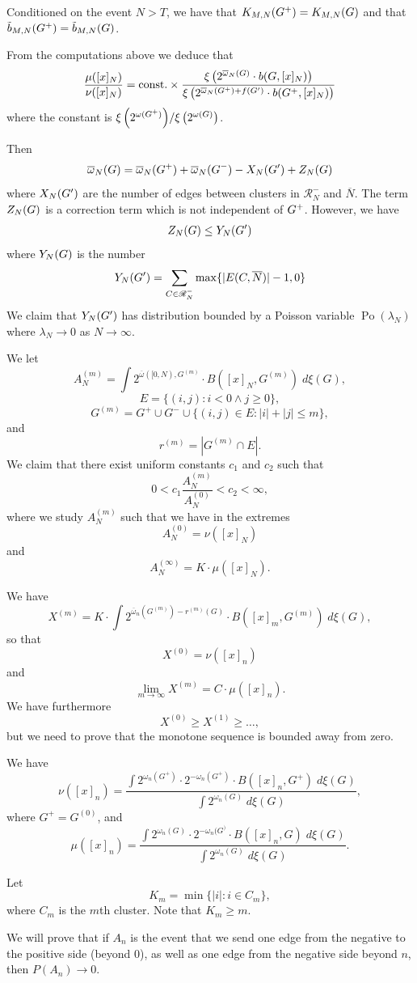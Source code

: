 \documentclass[11pt, a4paper, oneside]{scrartcl}
\theoremstyle{definition}
\theoremstyle{remark}
\providecommand{\mscr}{\mathscr}
\providecommand{\opn}{\operatorname}
\providecommand{\ol}{\overline}
\begin{document}
Conditioned on the event $N>T$, we have that $K_{M,N}(G^+)=K_{M,N}(G)$ and that $\tilde b_{M,N}(G^+)=\tilde b_{M,N}(G)$.

From the computations above we deduce that
\[
  \frac{\mu(\cy\N)}{\nu(\cy\N)} = \text{const.} \times
  \frac{\XI{2^{\ol\omega_\N(\t)} \cdot b(\t,\cy\N)}}
  {\XI{2^{\ol\omega_\N(\t^+) + f(\t')} \cdot b(\t^+,\cy\N)}}
\]
where the constant is \({\xi\left(2^{\omega(G^+)}\right)}/{\xi\left(2^{\omega(G)}\right)}\).


Then
\begin{equation}
  \ol\omega_N(\t) = \ol\omega_N(\t^+) + \ol\omega_N(\t^-) - X_N(\t') + Z_N(\t)
\end{equation}
where $X_N(G')$ are the number of edges between clusters in $\mscr R^-_N$ and
$\ol N$. The term $Z_N(G)$ is a correction term which is not independent of $G^+$.
However, we have
\[ Z_N(G) \le Y_N(G')\]
where $Y_N(G)$ is the number
\[
  Y_N(\t') = \sum_{C\in\mscr R^-_N} \max\{|E(C,\ol N)|-1,0\}
\]
We claim that $Y_N(G')$ has distribution bounded by a Poisson variable
$\opn{Po}(\lambda_N)$ where $\lambda_N\to 0$ as $N\to\infty$.


We let
$$A_N^{(m)}= \int 2^{\overline{\omega}([0,N), G^{(m)}}\cdot B([x]_N,G^{(m)}) \; d\xi (G),$$
$$E=\{(i,j): i<0 \wedge j\geq 0\},$$
$$G^{(m)}=G^+ \cup G^- \cup \{(i,j)\in E: |i|+|j|\leq m\},$$
and
$$r^{(m)}=|G^{(m)}\cap E|.$$
We claim that there exist uniform constants $c_1$ and $c_2$ such that
$$0<c_1\frac{A_N^{(m)}}{A_N^{(0)}}<c_2<\infty,$$
where we study $A_N^{(m)}$ such that we have in the extremes
$$A_N^{(0)}=\nu([x]_N)$$
and
$$A_N^{(\infty)}=K\cdot \mu([x]_N).$$

We have
$$X^{(m)}=K\cdot \int 2^{\overline{\omega}_n(G^{(m)})-r^{(m)}(G)}\cdot B([x]_m, G^{(m)})\; d\xi(G),$$
so that
$$X^{(0)}=\nu([x]_n)$$
and
$$\lim_{m \to \infty} X^{(m)}=C\cdot \mu([x]_n).$$
We have furthermore
$$X^{(0)}\geq X^{(1)}\geq \ldots,$$
but we need to prove that the monotone sequence is bounded away from zero.

We have
$$\nu([x]_n)=\frac{ \int 2^{\omega_n(G^+)}\cdot 2^{-\omega_n(G^+)}\cdot B([x]_n, G^+)\; d\xi(G)}{\int 2^{\omega_n(G)} \; d\xi(G)  },$$
where $G^+=G^{(0)}$, and
$$\mu([x]_n)=\frac{ \int 2^{\omega_n(G)}\cdot 2^{-\omega_n(G^)}\cdot B([x]_n, G)\; d\xi(G)}{\int 2^{\omega_n(G)} \; d\xi(G)  }.$$



Let
$$K_m=\min \{|i|: i\in C_m\},$$
where $C_m$ is the $m$th cluster. Note that $K_m\geq m$.

We will prove that if $A_n$ is the event that we send one edge from the negative to the positive side (beyond 0), as well as one edge from the negative side beyond $n$, then $P(A_n)\to 0$.
\end{document}
